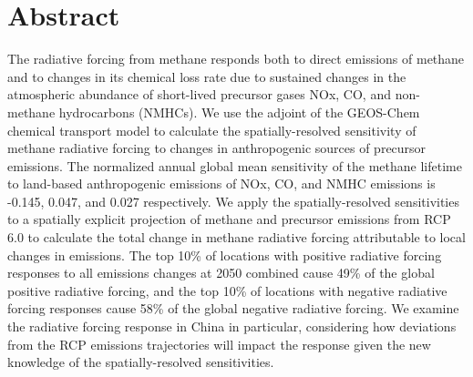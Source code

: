 \section*{Abstract}

The radiative forcing from methane responds both to direct emissions of methane and to changes in its chemical loss rate due to sustained changes in the atmospheric abundance of short-lived precursor gases NOx, CO, and non-methane hydrocarbons (NMHCs). We use the adjoint of the GEOS-Chem chemical transport model to calculate the spatially-resolved sensitivity of methane radiative forcing to changes in anthropogenic sources of precursor emissions. The normalized annual global mean sensitivity of the methane lifetime to land-based anthropogenic emissions of NOx, CO, and NMHC emissions is -0.145, 0.047, and 0.027 respectively. We apply the spatially-resolved sensitivities to a spatially explicit projection of methane and precursor emissions from RCP 6.0 to calculate the total change in methane radiative forcing attributable to local changes in emissions. The top 10\% of locations with positive radiative forcing responses to all emissions changes at 2050 combined cause 49\% of the global positive radiative forcing, and the top 10\% of locations with negative radiative forcing responses cause 58\% of the global negative radiative forcing. We examine the radiative forcing response in China in particular, considering how deviations from the RCP emissions trajectories will impact the response given the new knowledge of the spatially-resolved sensitivities.